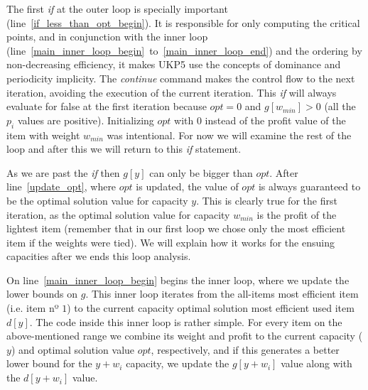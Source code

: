\documentclass[12pt]{article}
\begin{document}
The first \textit{if} at the outer loop is specially important (line~\ref{if_less_than_opt_begin}). It is responsible for only computing the critical points, and in conjunction with the inner loop (line~\ref{main_inner_loop_begin}~to~\ref{main_inner_loop_end}) and the ordering by non-decreasing efficiency, it makes UKP5 use the concepts of dominance and periodicity implicity. The \textit{continue} command makes the control flow to the next iteration, avoiding the execution of the current iteration. This \textit{if} will always evaluate for false at the first iteration because \(opt = 0\) and \(g[w_{min}] > 0\) (all the \(p_i\) values are positive). Initializing \(opt\) with \(0\) instead of the profit value of the item with weight \(w_{min}\) was intentional. For now we will examine the rest of the loop and after this we will return to this \textit{if} statement.

As we are past the \textit{if} then \(g[y]\) can only be bigger than \(opt\). After line~\ref{update_opt}, where \(opt\) is updated, the value of \(opt\) is always guaranteed to be the optimal solution value for capacity \(y\). This is clearly true for the first iteration, as the optimal solution value for capacity \(w_{min}\) is the profit of the lightest item (remember that in our first loop we chose only the most efficient item if the weights were tied). We will explain how it works for the ensuing capacities after we ends this loop analysis. %

On line~\ref{main_inner_loop_begin} begins the inner loop, where we update the lower bounds on \(g\). This inner loop iterates from the all-items most efficient item (i.e. item nº \(1\)) to the current capacity optimal solution most efficient used item \(d[y]\). The code inside this inner loop is rather simple. For every item on the above-mentioned range we combine its weight and profit to the current capacity (\(y\)) and optimal solution value \(opt\), respectively, and if this generates a better lower bound for the \(y+w_i\) capacity, we update the \(g[y+w_i]\) value along with the \(d[y+w_i]\) value.
\end{document}
